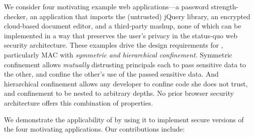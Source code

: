 We consider four motivating example web applications---a password
strength-checker, an application that imports the (untrusted) jQuery
library, an encrypted cloud-based document editor, and a third-party
mashup, none of which can be implemented in a way that preserves the
user's privacy in the status-quo web security architecture. These
examples drive the design requirements for \sys{}, particularly MAC
with {\em symmetric and hierarchical confinement.} Symmetric
confinement allows {\em mutually} distrusting principals each to pass
sensitive data to the other, and confine the other's use of the passed
sensitive data. And hierarchical confinement allows any developer to
confine code she does not trust, and confinement to be nested to
arbitrary depths.
%
No prior browser security architecture offers this combination of
properties.


We demonstrate the applicability of \sys{} by using it to implement
secure versions of the four motivating applications.
Our contributions include:

